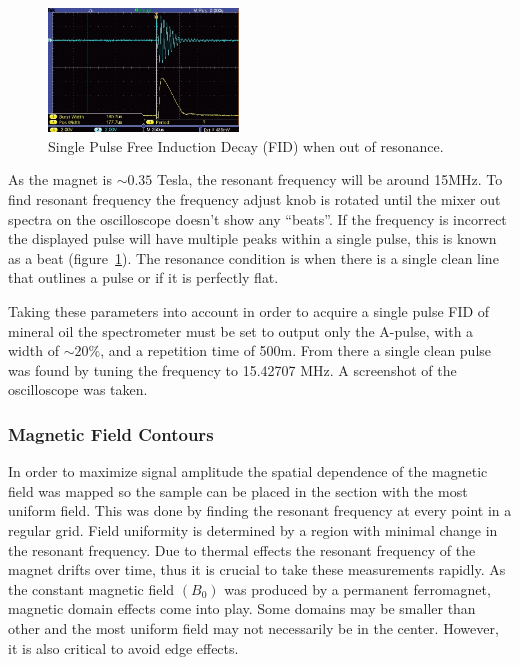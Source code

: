 \documentclass[
reprint,
amsmath,amssymb,
aps,
tikz,
border=5pt
]{revtex4-1}
\begin{document}
    
    \begin{figure}
        \includegraphics[width= 0.45\textwidth]{figures/noResonance.JPG}
        \caption{Single Pulse Free Induction Decay (FID) when out of resonance.}
        \label{fig:beats}
    \end{figure}

    As the magnet is $\sim 0.35$ Tesla, the resonant frequency will be around 15MHz. To find resonant frequency the frequency adjust knob is rotated until the mixer out spectra on the oscilloscope doesn't show any ``beats''. If the frequency is incorrect the displayed pulse will have multiple peaks within a single pulse, this is known as a beat (figure~\ref{fig:beats}). The resonance condition is when there is a single clean line that outlines a pulse or if it is perfectly flat. 

    Taking these parameters into account in order to acquire a single pulse FID of mineral oil the spectrometer must be set to output only the A-pulse, with a width of $\sim 20\%$, and a repetition time of 500m. From there a single clean pulse was found by tuning the frequency to 15.42707 MHz. A screenshot of the oscilloscope was taken. 

\subsubsection*{Magnetic Field Contours}

    In order to maximize signal amplitude the spatial dependence of the magnetic field was mapped so the sample can be placed in the section with the most uniform field. This was done by finding the resonant frequency at every point in a regular grid. Field uniformity is determined by a region with minimal change in the resonant frequency. Due to thermal effects the resonant frequency of the magnet drifts over time, thus  it is crucial to take these measurements rapidly. As the constant magnetic field $(B_0)$ was produced by a permanent ferromagnet, magnetic domain effects come into play. Some domains may be smaller than other and the most uniform field may not necessarily be in the center. However, it is also critical to avoid edge effects. 
    
\end{document}
